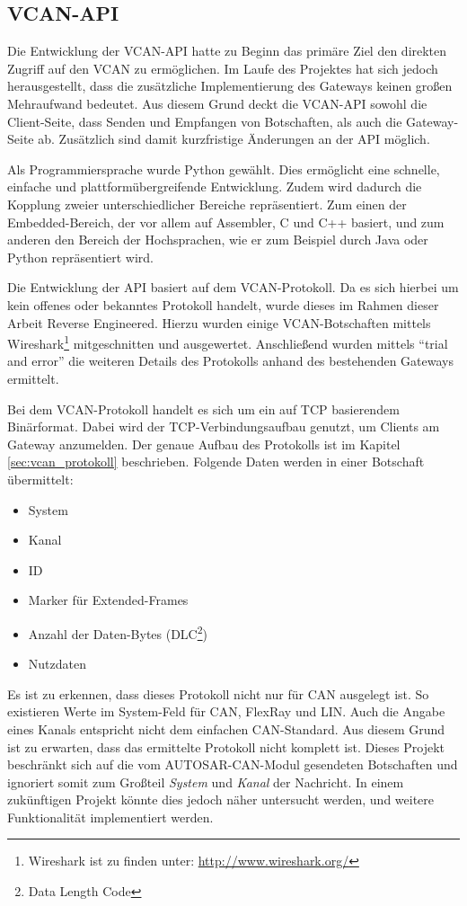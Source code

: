 \documentclass[
  a4paper,					    %
  twoside,
  DIV=calc,     				%
  bibliography=totoc,
  cleardoublepage=empty,
  ngerman,     					%
  final       					%
]{scrbook}
\begin{document}
\subsection{VCAN-API}
\label{sec:VCAN_API}
Die Entwicklung der VCAN-API hatte zu Beginn das primäre Ziel den direkten Zugriff auf den VCAN zu ermöglichen. Im Laufe des Projektes hat sich jedoch herausgestellt, dass die zusätzliche Implementierung des Gateways keinen großen Mehraufwand bedeutet. Aus diesem Grund deckt die VCAN-API sowohl die Client-Seite, dass Senden und Empfangen von Botschaften, als auch die Gateway-Seite ab. Zusätzlich sind damit kurzfristige Änderungen an der API möglich.

Als Programmiersprache wurde Python gewählt. Dies ermöglicht eine schnelle, einfache und plattformübergreifende Entwicklung. Zudem wird dadurch die Kopplung zweier unterschiedlicher Bereiche repräsentiert. Zum einen der Embedded-Bereich, der vor allem auf Assembler, C und C++ basiert, und zum anderen den Bereich der Hochsprachen, wie er zum Beispiel durch Java oder Python repräsentiert wird.

Die Entwicklung der API basiert auf dem VCAN-Protokoll. Da es sich hierbei um kein offenes oder bekanntes Protokoll handelt, wurde dieses im Rahmen dieser Arbeit Reverse Engineered. Hierzu wurden einige VCAN-Botschaften mittels Wireshark\footnote{Wireshark ist zu finden unter: \url{http://www.wireshark.org/}} mitgeschnitten und ausgewertet. Anschließend wurden mittels "`trial and error"' die weiteren Details des Protokolls anhand des bestehenden Gateways ermittelt.

Bei dem VCAN-Protokoll handelt es sich um ein auf TCP basierendem Binärformat. Dabei wird der TCP-Verbindungsaufbau genutzt, um Clients am Gateway anzumelden. Der genaue Aufbau des Protokolls ist im Kapitel \ref{sec:vcan_protokoll} beschrieben. Folgende Daten werden in einer Botschaft übermittelt:

\begin{itemize}
    \item System
    \item Kanal
    \item ID
    \item Marker für Extended-Frames
    \item Anzahl der Daten-Bytes (DLC\footnote{Data Length Code})
    \item Nutzdaten
\end{itemize}

Es ist zu erkennen, dass dieses Protokoll nicht nur für CAN ausgelegt ist. So existieren Werte im System-Feld für CAN, FlexRay und LIN. Auch die Angabe eines Kanals entspricht nicht dem einfachen CAN-Standard. Aus diesem Grund ist zu erwarten, dass das ermittelte Protokoll nicht komplett ist. Dieses Projekt beschränkt sich auf die vom AUTOSAR-CAN-Modul gesendeten Botschaften und ignoriert somit zum Großteil \emph{System} und \emph{Kanal} der Nachricht. In einem zukünftigen Projekt könnte dies jedoch näher untersucht werden, und weitere Funktionalität implementiert werden.
\end{document}
